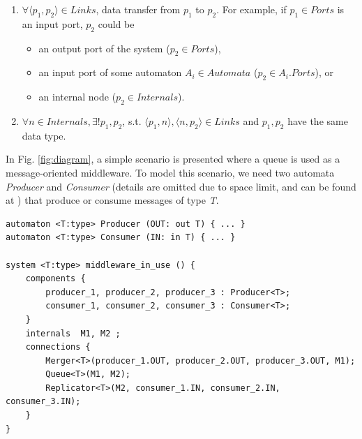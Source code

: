\begin{enumerate}
    \item $\forall \langle p_1,p_2\rangle \in Links$, data transfer from $p_1$ to $p_2$. For example, if $p_1\in Ports$ is an input port, $p_2$ could be
    \begin{itemize}
        \item an output port of the system ($p_2\in Ports$), 
        \item an input port of some automaton $A_i\in Automata$ ($p_2\in A_i.Ports$), or
        \item an internal node ($p_2\in Internals$).
    \end{itemize}
    \item $\forall n\in Internals,\exists!p_1,p_2$, s.t. $\langle p_1,n\rangle ,\langle n,p_2\rangle\in Links$ and $p_1,p_2$ have the same data type.
\end{enumerate}

\begin{example} In Fig. \ref{fig:diagram}, a simple scenario is presented where a queue is used as a message-oriented middleware. To model this scenario, we need two automata \emph{Producer} and \emph{Consumer} (details are omitted due to space limit, and can be found at \cite{medmodels}) that produce or consume messages of type \emph{T}.
\begin{lstlisting}
automaton <T:type> Producer (OUT: out T) { ... }
automaton <T:type> Consumer (IN: in T) { ... }

system <T:type> middleware_in_use () {
    components {
        producer_1, producer_2, producer_3 : Producer<T>;
        consumer_1, consumer_2, consumer_3 : Consumer<T>;
    }
    internals  M1, M2 ;
    connections {
        Merger<T>(producer_1.OUT, producer_2.OUT, producer_3.OUT, M1);
        Queue<T>(M1, M2);
        Replicator<T>(M2, consumer_1.IN, consumer_2.IN, consumer_3.IN);
    }
}
\end{lstlisting}
\label{exp:middleware_system}
\end{example}